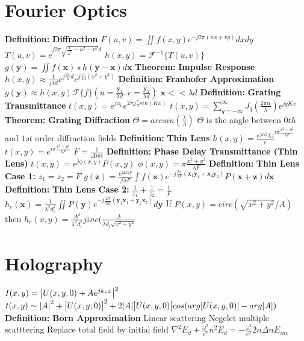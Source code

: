 \documentclass[14pt]{extarticle}
\def\Definition{{\color{blue} \textbf{Definition:} }}
\def\Theorem{{\color{red} \textbf{Theorem:} }}
\begin{document}
\begin{outline}
\section*{Fourier Optics}
	\1	\Definition \textbf{Diffraction}
		\2	$F(u,v) = \iint f(x,y) e^{-j 2\pi (u x + vy)} dx dy$
		\2	$T(u,v) = e^{j 2\pi \sqrt{\frac{1}{\lambda^2} - u^2 - v^2}d}$
		\2	$h(x,y) = \mathcal{F}^{-1}\{T(u,v)\}$
		\2	$g(\bm{y}) = \iint f(\bm{x}) \star h(\bm{y} - \bm{x}) d\bm{x}$
	\1	\Theorem \textbf{Impulse Response}
		\2	$h(x,y) \approx \frac{1}{j\lambda d} e^{j \frac{2\pi}{\lambda}d}
				e^{j \frac{\pi}{\lambda d}(x^2 + y^2)}$
	\1	\Definition \textbf{Franhofer Approximation}
		\2	$g(\bm{y}) \approx h(x,y) 
					\mathcal{F}\{f\}(u = \frac{\bm{y}_1}{\lambda d},v = \frac{\bm{y}_2}{\lambda d})$
		\2	$\bm{x} << \lambda d$
	\1	\Definition \textbf{Grating Transmittance}
		\2	$t(x,y) = e^{j\phi_0}e^{2\pi j \frac{\gamma}{\lambda}sin(Kx)}$
		\2	$t(x,y) = \sum_{q=-\infty}^{\infty} J_q(\frac{2\pi \alpha}{\lambda})e^{j q K x}$
	\1	\Theorem \textbf{Grating Diffraction}
		\2	$\Theta = arcsin(\frac{\lambda}{\Lambda})$
		\2	$\Theta$ is the angle between $0th$ and $1st$ order diffraction fields
	\1	\Definition \textbf{Thin Lens}
		\2	$h(x,y) = \frac{e^{jk_0 z}{\lambda z}}e^{i\pi \frac{x^2 + y^2}{\lambda F}}$
		\2	$t(x,y) = e^{i\pi \frac{x^2 + y^2}{\lambda F}}$
		\2	$F = \frac{1}{\Delta n \alpha}$
	\1	\Definition \textbf{Phase Delay Transmittance (Thin Lens)}
		\2	$t(x,y) = e^{j \phi(x,y)}P(x,y)$
		\2	$\phi(x,y) = \pi \frac{x^2 + y^2}{\lambda F}$
	\1	\Definition \textbf{Thin Lens Case 1: }$z_1 = z_2 = F$
		\2	$g(\bm{z}) = \frac{e^{j2k_0 F}}{j \lambda F}
					\int f(\bm{x})e^{-j \frac{2\pi}{\lambda F}(\bm{x}_1\bm{y}_1 +
						\bm{x}_2\bm{y}_2)} P(\bm{x} + \bm{z})d\bm{x}$
	\1	\Definition \textbf{Thin Lens Case 2: } $\frac{1}{z_1} + \frac{1}{z_2} = \frac{1}{F}$
		\2	$h_r(\bm{x}) = \frac{1}{\lambda^2 d_i^2}
				\iint P(\bm{y}) e^{-j \frac{2\pi}{\lambda d_i}(\bm{y}_1\bm{x}_1 +
					\bm{y}_2\bm{x}_2)}d\bm{y}$
		\2	If $P(x,y) = circ(\sqrt{x^2 + y^2} / A)$ then
				$h_r(x,y) = \frac{A^2}{\lambda^2 d_i^2}jinc(\frac{A}{\lambda d_i \sqrt{x^2 + y^2}}$
\section*{Holography}
	\1	$I(x,y) = \abs{U(x,y,0) + Ae^{jk_x x}}^2$
	\1	$t(x,y) \sim \abs{A}^2 + \abs{U(x,y,0)}^2 + 
				2 \abs{A}\abs{U(x,y,0)}cos(arg[U(x,y,0)] - arg[A])$
	\1	\Definition \textbf{Born Approximation}
		\2	Linear scattering
		\2	Negelct multiple scatttering
		\2	Replace total field by initial field
		\2	$\nabla^2 E_d + \frac{\omega^2}{c^2}n^2 E_d = 
					-\frac{\omega^2}{c^2}2n \Delta n E_{inc}$

\end{outline}
\end{document}
